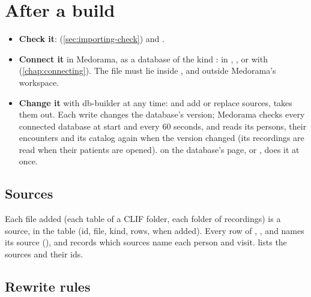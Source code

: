 \section{After a build}
\label{sec:importing-after}

\begin{itemize}
\item \textbf{Check it}:  (\cref{sec:importing-check}) and .
\item \textbf{Connect it} in Medorama, as a database of the kind : in ,
  , or with  (\cref{chap:connecting}). The file must lie inside
  , and outside Medorama's workspace.
\item \textbf{Change it} with db-builder at any time:  and  add or
  replace sources,  takes them out. Each write changes the database's version;
  Medorama checks every connected database at start and every 60 seconds, and reads its
  persons, their encounters and its catalog again when the version changed (its recordings are
  read when their patients are opened).  on the
  database's page, or , does it at once.
\end{itemize}

\subsection{Sources}
\label{sec:importing-batches}

Each file added (each table of a CLIF folder, each folder of recordings) is a source, in the
table  (id, file, kind, rows, when added). Every row of ,
,  and  names its source (), and
 records which sources name each person and visit.  lists
the sources and their ids.

\subsection{Rewrite rules}
\label{sec:importing-rules}

